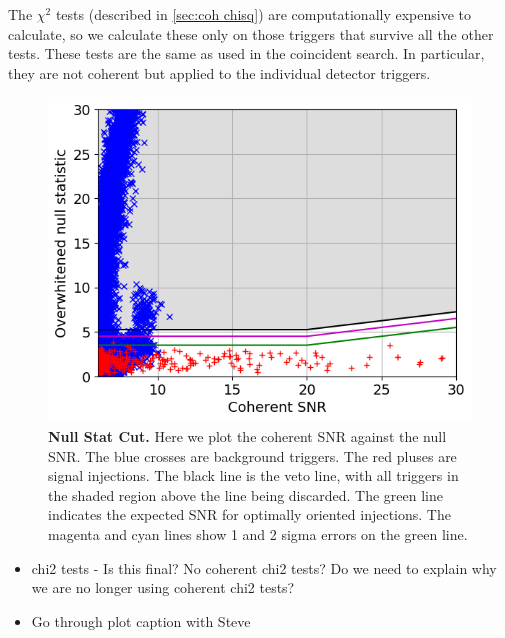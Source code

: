 \documentclass[11pt]{cuthesis}
\begin{document}
The $\chi^2$ tests (described in \ref{sec:coh chisq}) are computationally expensive to calculate, so we calculate these only on those triggers that survive all the other tests. These tests are the same as used in the coincident search. In particular, they are not coherent but applied to the individual detector triggers. 

\begin{figure} %
\begin{center}
\includegraphics[width=0.8\linewidth]{GRB170817A_null_stat2_vs_snr_zoom.png}
\end{center}
\caption{\textbf{Null Stat Cut.} Here we plot the coherent SNR against the null SNR. The blue crosses are background triggers. The red pluses are signal injections. The black line is the veto line, with all triggers in the shaded region above the line being discarded. The green line indicates the expected SNR for optimally oriented injections. The magenta and cyan lines show 1 and 2 sigma errors on the green line. }
\label{fig:nullcut}
\end{figure}



\begin{itemize}
\item chi2 tests - Is this final? No coherent chi2 tests? Do we need to explain why we are no longer using coherent chi2 tests? 
\item Go through plot caption with Steve
\end{itemize}
\end{document}
